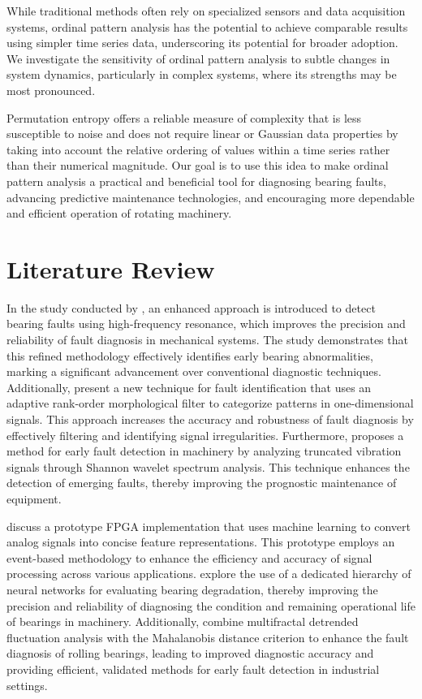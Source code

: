 \documentclass[sn-basic,pdflatex]{sn-jnl}
\theoremstyle{remark}
\theoremstyle{definition}
\begin{document}
While traditional methods often rely on specialized sensors and data
acquisition systems, ordinal pattern analysis has the potential to
achieve comparable results using simpler time series data, underscoring
its potential for broader adoption. We investigate the sensitivity of
ordinal pattern analysis to subtle changes in system dynamics,
particularly in complex systems, where its strengths may be most
pronounced.

Permutation entropy offers a reliable measure of complexity that is less
susceptible to noise and does not require linear or Gaussian data
properties by taking into account the relative ordering of values within
a time series rather than their numerical magnitude. Our goal is to use
this idea to make ordinal pattern analysis a practical and beneficial
tool for diagnosing bearing faults, advancing predictive maintenance
technologies, and encouraging more dependable and efficient operation of
rotating machinery.

\section{Literature Review}\label{sec2}

In the study conducted by \citet{WOS:000312724900101}, an enhanced
approach is introduced to detect bearing faults using high-frequency
resonance, which improves the precision and reliability of fault
diagnosis in mechanical systems. The study demonstrates that this
refined methodology effectively identifies early bearing abnormalities,
marking a significant advancement over conventional diagnostic
techniques. Additionally, \citet{WOS:000301688000008} present a new
technique for fault identification that uses an adaptive rank-order
morphological filter to categorize patterns in one-dimensional signals.
This approach increases the accuracy and robustness of fault diagnosis
by effectively filtering and identifying signal irregularities.
Furthermore, \citet{WOS:000303039300034} proposes a method for early
fault detection in machinery by analyzing truncated vibration signals
through Shannon wavelet spectrum analysis. This technique enhances the
detection of emerging faults, thereby improving the prognostic
maintenance of equipment.

\citet{WOS:000345844100102} discuss a prototype FPGA implementation that
uses machine learning to convert analog signals into concise feature
representations. This prototype employs an event-based methodology to
enhance the efficiency and accuracy of signal processing across various
applications. \citet{WOS:000396580800080} explore the use of a dedicated
hierarchy of neural networks for evaluating bearing degradation, thereby
improving the precision and reliability of diagnosing the condition and
remaining operational life of bearings in machinery. Additionally,
\citet{WOS:000320835800016} combine multifractal detrended fluctuation
analysis with the Mahalanobis distance criterion to enhance the fault
diagnosis of rolling bearings, leading to improved diagnostic accuracy
and providing efficient, validated methods for early fault detection in
industrial settings.
\end{document}
